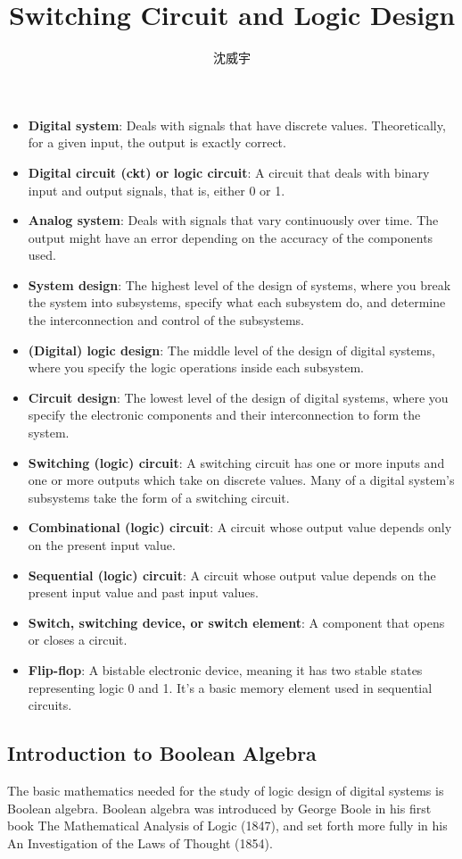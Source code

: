 \documentclass[a4paper,12pt]{article}
\begin{document}
\title{Switching Circuit and Logic Design}
\author{沈威宇}
\date{\temtoday}
\titletocdoc
{}
\begin{itemize}
\item\textbf{Digital system}: Deals with signals that have discrete values. Theoretically, for a given input, the output is exactly correct.
\item\textbf{Digital circuit (ckt) or logic circuit}: A circuit that deals with binary input and output signals, that is, either 0 or 1.
\item\textbf{Analog system}: Deals with signals that vary continuously over time. The output might have an error depending on the accuracy of the components used.
\item\textbf{System design}: The highest level of the design of systems, where you break the system into subsystems, specify what each subsystem do, and determine the interconnection and control of the subsystems.
\item\textbf{(Digital) logic design}: The middle level of the design of digital systems, where you specify the logic operations inside each subsystem.
\item\textbf{Circuit design}: The lowest level of the design of digital systems, where you specify the electronic components and their interconnection to form the system.
\item\textbf{Switching (logic) circuit}: A switching circuit has one or more inputs and one or more outputs which take on discrete values. Many of a digital system's subsystems take the form of a switching circuit.
\item\textbf{Combinational (logic) circuit}: A circuit whose output value depends only on the present input value.
\item\textbf{Sequential (logic) circuit}: A circuit whose output value depends on the present input value and past input values.
\item\textbf{Switch, switching device, or switch element}: A component that opens or closes a circuit.
\item\textbf{Flip-flop}: A bistable electronic device, meaning it has two stable states representing logic 0 and 1. It's a basic memory element used in sequential circuits.
\end{itemize}
\subsection{Introduction to Boolean Algebra}
The basic mathematics needed for the study of logic design of digital systems is Boolean algebra. Boolean algebra was introduced by George Boole in his first book The Mathematical Analysis of Logic (1847), and set forth more fully in his An Investigation of the Laws of Thought (1854).
\end{document}
